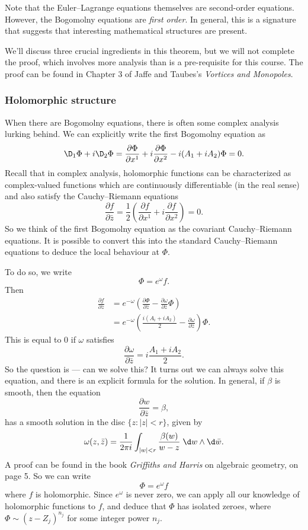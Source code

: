 \documentclass[a4paper]{article}
\begin{document}
Note that the Euler--Lagrange equations themselves are second-order equations. However, the Bogomolny equations are \emph{first order}. In general, this is a signature that suggests that interesting mathematical structures are present.

We'll discuss three crucial ingredients in this theorem, but we will not complete the proof, which involves more analysis than is a pre-requisite for this course. The proof can be found in Chapter 3 of Jaffe and Taubes's \emph{Vortices and Monopoles}.

\subsubsection*{Holomorphic structure}
When there are Bogomolny equations, there is often some complex analysis lurking behind. We can explicitly write the first Bogomolny equation as
\[
  \D_1 \Phi + i \D_2 \Phi = \frac{\partial \Phi}{\partial x^1} + i\frac{\partial \Phi}{\partial x^2} - i(A_1 + i A_2) \Phi = 0.
\]
Recall that in complex analysis, holomorphic functions can be characterized as complex-valued functions which are continuously differentiable (in the real sense) and also satisfy the Cauchy--Riemann equations
\[
  \frac{\partial f}{\partial \bar{z}} = \frac{1}{2} \left(\frac{\partial f}{\partial x^1} + i \frac{\partial f}{\partial x^2}\right) = 0.
\]
So we think of the first Bogomolny equation as the covariant Cauchy--Riemann equations. It is possible to convert this into the standard Cauchy--Riemann equations to deduce the local behaviour at $\Phi$.

To do so, we write
\[
  \Phi = e^{\omega} f.
\]
Then
\begin{align*}
  \frac{\partial f}{\partial \bar{z}} &= e^{-\omega} \left(\frac{\partial \Phi}{\partial \bar{z}} - \frac{\partial \omega}{\partial \bar{z}} \Phi\right)\\
  &= e^{-\omega} \left(\frac{i(A_i + i A_2)}{2} - \frac{\partial \omega}{\partial \bar{z}}\right)\Phi.
\end{align*}
This is equal to $0$ if $\omega$ satisfies
\[
  \frac{\partial \omega}{\partial \bar{z}} = i \frac{A_1 + iA_2}{2}.
\]
So the question is --- can we solve this? It turns out we can always solve this equation, and there is an explicit formula for the solution. In general, if $\beta$ is smooth, then the equation
\[
  \frac{\partial w}{\partial \bar{z}} = \beta,
\]
has a smooth solution in the disc $\{z: |z| < r\}$, given by
\[
  \omega(z, \bar{z}) = \frac{1}{2\pi i} \int_{|w| < r} \frac{\beta(w)}{w - z}\;\d w \wedge \d \bar{w}.
\]
A proof can be found in the book \emph{Griffiths and Harris} on algebraic geometry, on page 5. So we can write
\[
  \Phi = e^{\omega} f
\]
where $f$ is holomorphic. Since $e^{\omega}$ is never zero, we can apply all our knowledge of holomorphic functions to $f$, and deduce that $\Phi$ has isolated zeroes, where $\Phi \sim (z - Z_j)^{n_j}$ for some integer power $n_j$.
\end{document}
